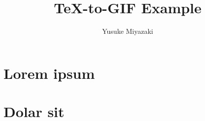 \documentclass[uplatex]{jsarticle}
\title{\TeX-to-GIF Example}
\author{Yusuke Miyazaki}
\begin{document}
\maketitle

\section{Lorem ipsum}
\lipsum[1-5]

\section{Dolar sit}
\lipsum[6]
\end{document}
